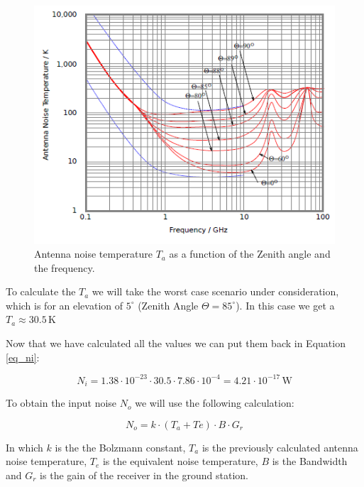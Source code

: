 \documentclass[a4paper,12pt,calibri,oneside,openany]{book}
\newcommand{\unit}[1]{\ensuremath{\, \mathrm{#1}}}
\theoremstyle{break}
\begin{document}
		\begin{figure}[h]
			\centering
			\includegraphics[width=14cm]{graph_TA}
			\caption{Antenna noise temperature $T_{a}$ as a function of the Zenith angle and the frequency.}
			\label{graf_TA}
		\end{figure}
		
		
		To calculate the $T_{a}$ we will take the worst case scenario under consideration, which is for an elevation of $5^{\circ}$ (Zenith Angle $\Theta = 85^{\circ}$). In this case we get a $T_{a} \approx 30.5 \unit{K} $
	
		Now that we have calculated all the values we can put them back in Equation \ref{eq_ni}:
	
		\begin{equation} \label{eq_ni2}
			N_{i} = 1.38 \cdot 10^{-23} \cdot 30.5 \cdot 7.86 \cdot 10^{-4} = 4.21 \cdot 10^{-17} \unit{W}
		\end{equation}
	
		To obtain the input noise $N_{o}$ we will use the following calculation:
		
		\begin{equation} \label{eq_no}
			N_{o} = k \cdot \left(T_{a} + T{e} \right) \cdot B \cdot G_{r} 
		\end{equation}
	
		In which $k$ is the the Bolzmann constant, $T_{a}$ is the previously calculated antenna noise temperature, $T_{e}$ is the equivalent noise temperature, $B$ is the Bandwidth and $G_{r}$ is the gain of the receiver in the ground station. 
		
\end{document}
